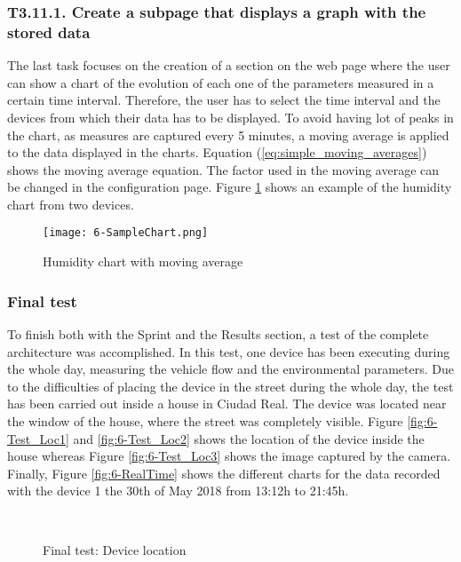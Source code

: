 \subsubsection{T3.11.1. Create a subpage that displays a graph with the stored data}
The last task focuses on the creation of a section on the web page where the user can show a chart of the evolution of each one of the parameters measured in a certain time interval. Therefore, the user has to select the time interval and the devices from which their data has to be displayed. To avoid having lot of peaks in the chart, as measures are captured every 5 minutes, a moving average is applied to the data displayed in the charts. Equation (\ref{eq:simple_moving_averages}) shows the moving average equation. The factor used in the moving average can be changed in the configuration page. Figure \ref{fig:6-SampleChart} shows an example of the humidity chart from two devices.

\begin{figure}[!h]
	\begin{center}
		\texttt{[image: 6-SampleChart.png]}
		\caption{Humidity chart with moving average}
		\label{fig:6-SampleChart}
	\end{center}
\end{figure}


\subsubsection{Final test}
To finish both with the Sprint and the Results section, a test of the complete architecture was accomplished. In this test, one device has been executing during the whole day, measuring the vehicle flow and the environmental parameters. Due to the difficulties of placing the device in the street during the whole day, the test has been carried out inside a house in Ciudad Real. The device was located near the window of the house, where the street was completely visible. Figure \ref{fig:6-Test_Loc1} and \ref{fig:6-Test_Loc2} shows the location of the device inside the house whereas Figure \ref{fig:6-Test_Loc3} shows the image captured by the camera. Finally, Figure \ref{fig:6-RealTime} shows the different charts for the data recorded with the device 1 the 30th of May 2018 from 13:12h to 21:45h.

\begin{figure}[htb]
	\centering
	\\
	\caption{Final test: Device location}
	\label{fig:6-Test_Loc}
\end{figure}

